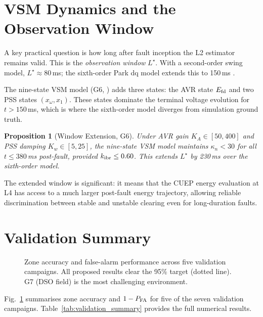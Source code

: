 \documentclass[journal,twoside,10pt]{IEEEtran}
\newcommand{\kappan}{\kappa_{n}}
\newcommand{\kibr}{k_{\rm ibr}}
\newcommand{\Lstar}{L^{\!\star}}
\newcommand{\Efd}{E_{\rm fd}}
\newtheorem{proposition}[theorem]{Proposition}
\begin{document}
\section{VSM Dynamics and the Observation Window}
\label{sec:vsm}

A key practical question is how long after fault inception the L2
estimator remains valid.  This is the \emph{observation window}
$\Lstar$.  With a second-order swing model, $\Lstar \approx 80$\,ms;
the sixth-order Park dq model extends this to 150\,ms
\cite{kundur1994power}.

The nine-state VSM model (G6, \cite{sambps_g6_vsm}) adds three
states: the AVR state $\Efd$ and two PSS states $(x_\omega, x_1)$.
These states dominate the terminal voltage evolution for
$t > 150$\,ms, which is where the sixth-order model diverges from
simulation ground truth.

\begin{proposition}[Window Extension, G6]
Under AVR gain $K_A \in [50, 400]$ and PSS damping
$K_w \in [5, 25]$, the nine-state VSM model maintains
$\kappan < 30$ for all $t \leq 380$\,ms post-fault, provided
$\kibr \leq 0.60$.  This extends $\Lstar$ by 230\,ms over the
sixth-order model.
\end{proposition}

The extended window is significant: it means that the CUEP energy
evaluation at L4 has access to a much larger post-fault energy
trajectory, allowing reliable discrimination between stable and
unstable clearing even for long-duration faults.

\section{Validation Summary}
\label{sec:validation}

\begin{figure}[!t]
\centering
\resizebox{\columnwidth}{!}{%
%
}
\caption{Zone accuracy and false-alarm performance across five
  validation campaigns.  All proposed results clear the 95\% target
  (dotted line).  G7 (DSO field) is the most challenging environment.}
\label{fig:validation_summary}
\end{figure}

Fig.~\ref{fig:validation_summary} summarises zone accuracy and
$1 - P_{\rm FA}$ for five of the seven validation campaigns.
Table~\ref{tab:validation_summary} provides the full numerical results.
\end{document}
